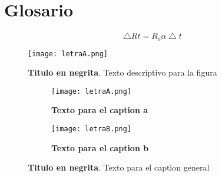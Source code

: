 \newpage
\chapter*{Glosario}
	

\begin{equation}\label{eq:Label}
	\bigtriangleup Rt = R_{o}\alpha\bigtriangleup t 
\end{equation}


\begin{figure}[tb]
	\centering
	\texttt{[image: letraA.png]} %
	\caption[Titulo de la figura, este texto saldra en la lista de figuras]{\textbf{Titulo en negrita}. Texto descriptivo para la figura} 
	\label{fig:label}
\end{figure}

\begin{figure}[tb]
	\centering
	\begin{subfigure}[t]{0.49\textwidth}
		\centering
		\texttt{[image: letraA.png]} %
		\caption{\textbf{Texto para el caption a}}
		\label{fig:labelA}
	\end{subfigure}
	\hfill
	\begin{subfigure}[t]{0.49\textwidth}
		\centering
		\texttt{[image: letraB.png]} %
		\caption{\textbf{Texto para el caption b}}
		\label{fig:labelB}
	\end{subfigure}
	
	\caption[Texto para la lista de figuras 1]{\textbf{Titulo en negrita}. Texto para el caption general \label{fig:Label}}
\end{figure}



